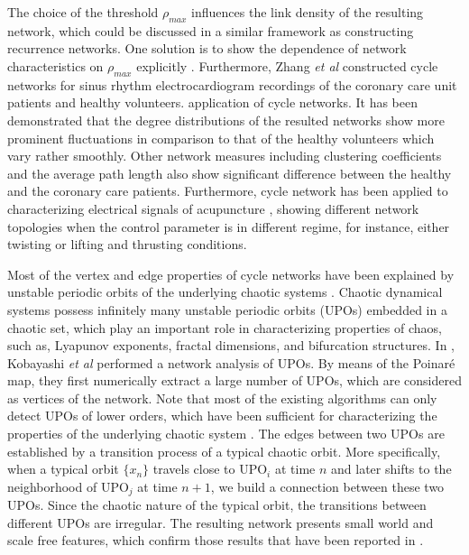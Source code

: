 		The choice of the threshold $\rho_{max}$ influences the link density of the resulting network, which could be discussed in a similar framework as constructing recurrence networks. One solution is to show the dependence of network characteristics on $\rho_{max}$ explicitly \cite{Zhang2006}. Furthermore, Zhang {\textit {et al}} constructed cycle networks for sinus rhythm electrocardiogram recordings of the coronary care unit patients and healthy volunteers. application of cycle networks. It has been demonstrated that the degree distributions of the resulted networks show more prominent fluctuations in comparison to that of the healthy volunteers which vary rather smoothly. Other network measures including clustering coefficients and the average path length also show significant difference between the healthy and the coronary care patients. Furthermore, cycle network has been applied to characterizing electrical signals of acupuncture \cite{Men2011}, showing different network topologies when the control parameter is in different regime, for instance, either twisting or lifting and thrusting conditions. 
		
		Most of the vertex and edge properties of cycle networks have been explained by unstable periodic orbits of the underlying chaotic systems \cite{Zhang2006}. Chaotic dynamical systems possess infinitely many unstable periodic orbits (UPOs) embedded in a chaotic set, which play an important role in characterizing properties of chaos, such as, Lyapunov exponents, fractal dimensions, and bifurcation structures. In \cite{Kobayashi2017}, Kobayashi {\textit{et al}} performed a network analysis of UPOs. By means of the Poinar{\'e} map, they first numerically extract a large number of UPOs, which are considered as vertices of the network. Note that most of the existing algorithms can only detect UPOs of lower orders, which have been sufficient for characterizing the properties of the underlying chaotic system \cite{Cvitanovic1988,Grebogi1988}. The edges between two UPOs are established by a transition process of a typical chaotic orbit. More specifically, when a typical orbit $\{ x_n \}$ travels close to UPO$_i$ at time $n$ and later shifts to the neighborhood of UPO$_j$ at time $n+1$, we build a connection between these two UPOs. Since the chaotic nature of the typical orbit, the transitions between different UPOs are irregular. The resulting network presents small world and scale free features, which confirm those results that have been reported in \cite{Zhang2006}. 
		
				

